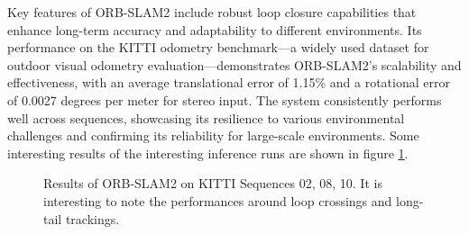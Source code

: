 \documentclass[11pt,a4paper]{article}
\begin{document}
Key features of ORB-SLAM2 include robust loop closure capabilities that enhance long-term accuracy and adaptability to different environments. Its performance on the KITTI \cite{KITTI} odometry benchmark—a widely used dataset for outdoor visual odometry evaluation—demonstrates ORB-SLAM2's scalability and effectiveness, with an average translational error of 1.15\% and a rotational error of 0.0027 degrees per meter for stereo input. The system consistently performs well across sequences, showcasing its resilience to various environmental challenges and confirming its reliability for large-scale environments. Some interesting results of the interesting inference runs are shown in figure \ref{fig:orb-slam2}.



\begin{figure}[h!]
    \centering
    \hspace{0.05\textwidth} %
    \hspace{0.05\textwidth} %
    \caption{Results of ORB-SLAM2 on KITTI Sequences 02, 08, 10. It is interesting to note the performances around loop crossings and long-tail trackings.}
    \label{fig:orb-slam2}
\end{figure}
\end{document}
